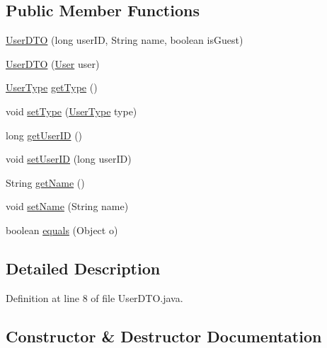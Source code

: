 \subsection*{Public Member Functions}
\begin{DoxyCompactItemize}
\item 
\mbox{\hyperlink{classes_1_1deusto_1_1server_1_1data_1_1_user_d_t_o_a00e605694b6157bcf7a1acc5e2adc735}{User\+D\+TO}} (long user\+ID, String name, boolean is\+Guest)
\item 
\mbox{\hyperlink{classes_1_1deusto_1_1server_1_1data_1_1_user_d_t_o_ab05044a5b24bdbdcc1bbe582b7268b71}{User\+D\+TO}} (\mbox{\hyperlink{classes_1_1deusto_1_1server_1_1jdo_1_1_user}{User}} user)
\item 
\mbox{\hyperlink{enumes_1_1deusto_1_1server_1_1jdo_1_1_user_type}{User\+Type}} \mbox{\hyperlink{classes_1_1deusto_1_1server_1_1data_1_1_user_d_t_o_a4e7fdc51138f595198b84687dadd3388}{get\+Type}} ()
\item 
void \mbox{\hyperlink{classes_1_1deusto_1_1server_1_1data_1_1_user_d_t_o_aa02d6027ea9d142a1358f142f5c88f2d}{set\+Type}} (\mbox{\hyperlink{enumes_1_1deusto_1_1server_1_1jdo_1_1_user_type}{User\+Type}} type)
\item 
long \mbox{\hyperlink{classes_1_1deusto_1_1server_1_1data_1_1_user_d_t_o_ae04b78d874974f7f3307b68fa2a15210}{get\+User\+ID}} ()
\item 
void \mbox{\hyperlink{classes_1_1deusto_1_1server_1_1data_1_1_user_d_t_o_ad96e17b7c2a478f263f7a7b8bf7dde14}{set\+User\+ID}} (long user\+ID)
\item 
String \mbox{\hyperlink{classes_1_1deusto_1_1server_1_1data_1_1_user_d_t_o_a3e5416e48bbbd923f0d23b87f02e3aaf}{get\+Name}} ()
\item 
void \mbox{\hyperlink{classes_1_1deusto_1_1server_1_1data_1_1_user_d_t_o_a15f7773676e2cca068e63f604fb61ab0}{set\+Name}} (String name)
\item 
boolean \mbox{\hyperlink{classes_1_1deusto_1_1server_1_1data_1_1_user_d_t_o_a2963ea7c4e6ae150e958abc1f0ce2bbb}{equals}} (Object o)
\end{DoxyCompactItemize}


\subsection{Detailed Description}


Definition at line 8 of file User\+D\+T\+O.\+java.



\subsection{Constructor \& Destructor Documentation}
\mbox{\label{classes_1_1deusto_1_1server_1_1data_1_1_user_d_t_o_a00e605694b6157bcf7a1acc5e2adc735}} 
